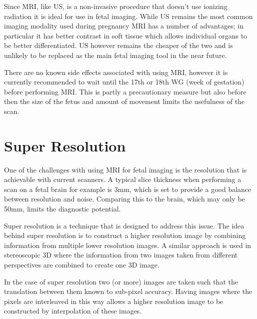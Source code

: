 Since MRI, like US, is a non-invasive procedure that doesn’t use ionizing radiation it is ideal for use in fetal imaging. While US remains the most common imaging modality used during pregnancy MRI has a number of advantages; in particular it has better contrast in soft tissue which allows individual organs to be better differentiated. US however remains the cheaper of the two and is unlikely to be replaced as the main fetal imaging tool in the near future.

There are no known side effects associated with using MRI, however it is currently recommended to wait until the 17th or 18th WG (week of gestation) before performing MRI. This is partly a precautionary measure but also before then the size of the fetus and amount of movement limits the usefulness of the scan.

\newpage
\section{Super Resolution}\label{background:superresolution}

One of the challenges with using MRI for fetal imaging is the resolution that is achievable with current scanners. A typical slice thickness when performing a scan on a fetal brain for example is 3mm, which is set to provide a good balance between resolution and noise. Comparing this to the brain, which may only be 50mm, limits the diagnostic potential.

Super resolution is a technique that is designed to address this issue. The idea behind super resolution is to construct a higher resolution image by combining information from multiple lower resolution images. A similar approach is used in stereoscopic 3D where the information from two images taken from different perspectives are combined to create one 3D image.

In the case of super resolution two (or more) images are taken such that the translation between them known to sub-pixel accuracy. Having images where the pixels are interleaved in this way allows a higher resolution image to be constructed by interpolation of these images.

